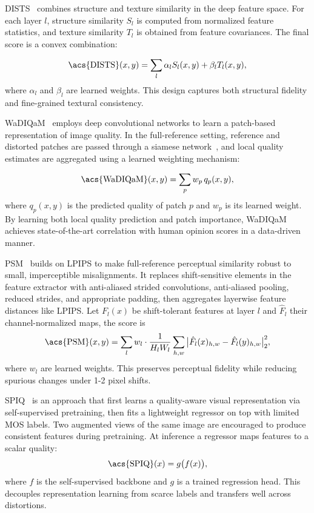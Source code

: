 \acf{DISTS}~\cite{ding2020dists} combines structure and texture similarity in the deep feature space. For each layer $l$, structure similarity $S_l$ is computed from normalized feature statistics, and texture similarity $T_l$ is obtained from feature covariances. The final score is a convex combination:

\begin{equation}
\text{\acs{DISTS}}(x,y) = \sum_{l} \alpha_l S_l(x,y) + \beta_l T_l(x,y),
\end{equation}
where $\alpha_l$ and $\beta_l$ are learned weights. This design captures both structural fidelity and fine-grained textural consistency.

\acf{WaDIQaM}~\cite{bosse2017wadiqam} employs deep convolutional networks to learn a patch-based representation of image quality. In the full-reference setting, reference and distorted patches are passed through a siamese network~\cite{bromley1993signature}, and local quality estimates are aggregated using a learned weighting mechanism:

\begin{equation}
\text{\acs{WaDIQaM}}(x,y) = \sum_{p} w_p \, q_p(x,y),
\end{equation}
where $q_p(x,y)$ is the predicted quality of patch $p$ and $w_p$ is its learned weight. By learning both local quality prediction and patch importance, \acs{WaDIQaM} achieves state-of-the-art correlation with human opinion scores in a data-driven manner.

\acf{PSM}~\cite{ghildyal2022psm} builds on \acs{LPIPS} to make full-reference perceptual similarity robust to small, imperceptible misalignments. It replaces shift-sensitive elements in the feature extractor with anti-aliased strided convolutions, anti-aliased pooling, reduced strides, and appropriate padding, then aggregates layerwise feature distances like \acs{LPIPS}. Let $F_l(x)$ be shift-tolerant features at layer $l$ and $\hat{F}_l$ their channel-normalized maps, the score is
\begin{equation}
\text{\acs{PSM}}(x,y) = \sum_{l} w_l \cdot \frac{1}{H_l W_l}\sum_{h,w} \big| \hat{F}_l(x)_{h,w}-\hat{F}_l(y)_{h,w}\big|_2^2,
\end{equation}
where $w_l$ are learned weights. This preserves perceptual fidelity while reducing spurious changes under 1-2 pixel shifts.

\acf{SPIQ}~\cite{chen2022spiq} is an approach that first learns a quality-aware visual representation via self-supervised pretraining, then fits a lightweight regressor on top with limited \acs{MOS} labels. Two augmented views of the same image are encouraged to produce consistent features during pretraining. At inference a regressor maps features to a scalar quality:
\begin{equation}
\text{\acs{SPIQ}}(x) = g\big(f(x)\big),
\end{equation}
where $f$ is the self-supervised backbone and $g$ is a trained regression head. This decouples representation learning from scarce labels and transfers well across distortions.
